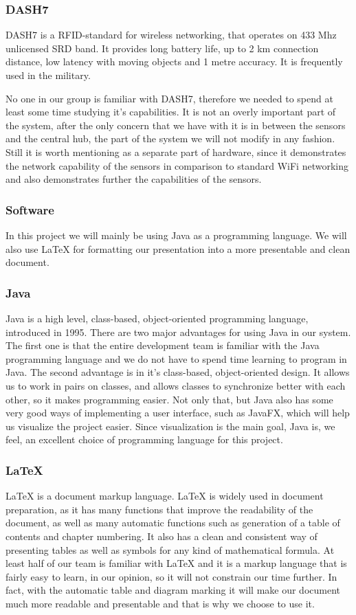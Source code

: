 \documentclass[../document]{subfiles}
\begin{document}
\subsubsection{DASH7}
DASH7 is a RFID-standard for wireless networking, that operates on 433 Mhz unlicensed SRD band. It provides long battery life, up to 2 km connection distance, low latency with moving objects and 1 metre accuracy. It is frequently used in the military.

No one in our group is familiar with DASH7, therefore we needed to spend at least some time studying it’s capabilities. It is not an overly important part of the system, after the only concern that we have with it is in between the sensors and the central hub, the part of the system we will not modify in any fashion. Still it is worth mentioning as a separate part of hardware, since it demonstrates the network capability of the sensors in comparison to standard WiFi networking and also demonstrates further the capabilities of the sensors.

\subsubsection{Software}
In this project we will mainly be using Java as a programming language. We will also use LaTeX for formatting our presentation into a more presentable and clean document.

\subsubsection{Java}
Java is a high level, class-based, object-oriented programming language, introduced in 1995. There are two major advantages for using Java in our system. The first one is that the entire development team is familiar with the Java programming language and we do not have to spend time learning to program in Java. The second advantage is in it’s class-based, object-oriented design. It allows us to work in pairs on classes, and allows classes to synchronize better with each other, so it makes programming easier. Not only that, but Java also has some very good ways of implementing a user interface, such as JavaFX, which will help us visualize the project easier. Since visualization is the main goal, Java is, we feel, an excellent choice of programming language for this project.

\subsubsection{\LaTeX}
LaTeX is a document markup language. LaTeX is widely used in document preparation, as it has many functions that improve the readability of the document, as well as many automatic functions such as generation of a table of contents and chapter numbering. It also has a clean and consistent way of presenting tables as well as symbols for any kind of mathematical formula. At least half of our team is familiar with LaTeX and it is a markup language that is fairly easy to learn, in our opinion, so it will not constrain our time further. In fact, with the automatic table and diagram marking it will make our document much more readable and presentable and that is why we choose to use it.
\end{document}
